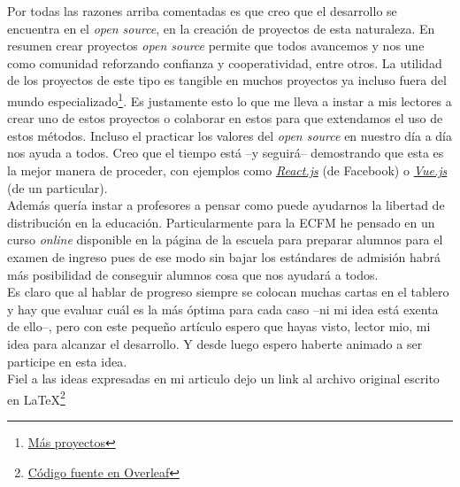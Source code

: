 \documentclass{article}
\begin{document}
Por todas las razones arriba comentadas es que creo que el desarrollo se encuentra en el \textit{open source}, en la creación de proyectos de esta naturaleza. En resumen crear proyectos \textit{open source} permite que todos avancemos y nos une como comunidad reforzando confianza y cooperatividad, entre otros. La utilidad de los proyectos de este tipo es tangible en muchos proyectos ya incluso fuera del mundo especializado\footnote{\href{https://www.redhat.com/en/open-source-stories}{Más proyectos}}. Es justamente esto lo que me lleva a instar a mis lectores a crear uno de estos proyectos o colaborar en estos para que extendamos el uso de estos métodos. Incluso el practicar los valores del \textit{open source} en nuestro día a día nos ayuda a todos. Creo que el tiempo está –y seguirá– demostrando que esta es la mejor manera de proceder, con ejemplos como \textit{\href{https://reactjs.org/}{React.js}} (de Facebook) o \textit{\href{https://vuejs.org/}{Vue.js}} (de un particular).\\

Además quería instar a profesores a pensar como puede ayudarnos la libertad de distribución en la educación. Particularmente para la ECFM he pensado en un curso \textit{online} disponible en la página de la escuela para preparar alumnos para el examen de ingreso pues de ese modo sin bajar los estándares de admisión habrá más posibilidad de conseguir alumnos cosa que nos ayudará a todos.\\

Es claro que al hablar de progreso siempre se colocan muchas cartas en el tablero y hay que evaluar cuál es la más óptima para cada caso –ni mi idea está exenta de ello–, pero con este pequeño artículo espero que hayas visto, lector mio, mi idea para alcanzar el desarrollo. Y desde luego espero haberte animado a ser participe en esta idea.\\

Fiel a las ideas expresadas en mi articulo dejo un link al archivo original escrito en \LaTeX\footnote{\href{https://www.overleaf.com/docs?snip_uri=https://amadocab.github.io/Intentopages/HT4_EDO2.tex}{Código fuente en Overleaf}}

\end{document}

